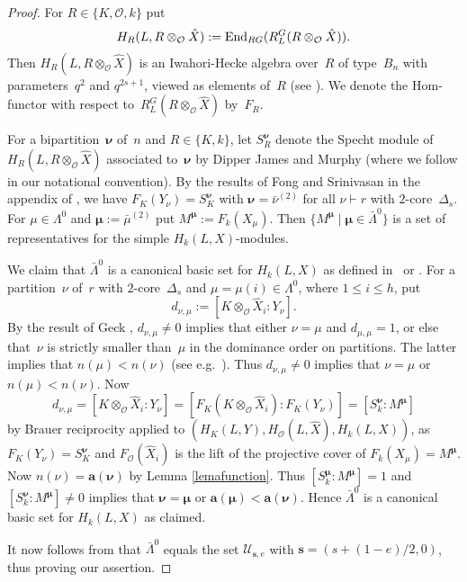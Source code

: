 \documentclass[twoside,12pt]{amsart}
\theoremstyle{plain}
\begin{document}
\begin{proof}
For $R \in \{ K, \mathcal{O}, k \}$ put
$$H_R(L, R \otimes_{\mathcal{O}} \hat{X} ) :=
{\mbox{\rm End}}_{RG}( R_L^G( R \otimes_{\mathcal{O}} \hat{X} ) ).$$
Then $H_R(L, R \otimes_{\mathcal{O}} \hat{X} )$ is an Iwahori-Hecke
algebra over~$R$ of type~$B_n$ with parameters~$q^2$ and $q^{2s+1}$, viewed as
elements of~$R$ (see \cite[p.~$464$]{C}). We denote the Hom-functor with respect 
to~$R_L^G( R \otimes_{\mathcal{O}} \hat{X} )$ by~$F_R$.

For a bipartition~${\boldsymbol{\nu}}$ of~$n$ and $R \in \{K, k \}$, let $S^{\boldsymbol{\nu}}_R$
denote the Specht module of $H_R( L, R \otimes_{\mathcal{O}} \hat{X} )$
associated to~${\boldsymbol{\nu}}$ by Dipper James and Murphy \cite[Theorem~$4.22$]{DiJaMu} 
(where we follow \cite{GeckJacon2011} in our notational convention).
By the results of Fong and Srinivasan in the appendix of 
\cite{FongSrinivasan1990}, we have $F_K( Y_\nu ) = S_K^{\boldsymbol{\nu}}$
with ${\boldsymbol{\nu}} = \bar{\nu}^{(2)}$ for all $\nu \vdash r$ with $2$-core~$\Delta_s$.
For $\mu \in \Lambda^0$ and ${\boldsymbol{\mu}} := \bar{\mu}^{(2)}$ put $M^{\boldsymbol{\mu}} := 
F_k( X_\mu )$. Then $\{ M^{\boldsymbol{\mu}} \mid {\boldsymbol{\mu}} \in \bar{\Lambda}^0 \}$ is a set
of representatives for the simple $H_k( L, X )$-modules.

We claim that $\bar{\Lambda}^0$ is a canonical basic set for $H_k( L, X )$
as defined in~\cite[Definition~$3.2.1$]{GeckJacon2011} or 
\cite[Definition~$2.4$]{GeckJacon2006}. 
For a partition~$\nu$ of~$r$ with
$2$-core~$\Delta_s$ and
$\mu  = \mu(i) \in \Lambda^0$,  where $1 \leq i \leq h$, put 
$$d_{\nu,\mu} := [ K \otimes_{\mathcal{O}} \hat{X}_i\colon\!Y_\nu ].$$
By the result of Geck \cite{Geck1991}, $d_{\nu,\mu} \neq 0$ implies that 
either $\nu = \mu$ and $d_{\mu,\mu} = 1$, or else that~$\nu$ is strictly 
smaller than~$\mu$
in the dominance order on partitions. The latter implies that
$n( \mu ) < n( \nu )$ (see e.g.\ \cite[Exercise~$5.6$]{GeckPfeiffer2000}). 
Thus $d_{\nu,\mu} \neq 0$ implies that $\nu = \mu$ or $n(\mu) < n(\nu)$.
Now
$$d_{\nu,\mu} = [ K \otimes_{\mathcal{O}} \hat{X}_i\colon\!Y_\nu ]
= [ F_K( K \otimes_{\mathcal{O}} \hat{X}_i )\colon\!F_K( Y_\nu ) ]
= [ S_k^{\boldsymbol{\nu}}\colon\!M^{\boldsymbol{\mu}} ]$$
by Brauer reciprocity applied to $(H_K( L, Y ), H_{\mathcal{O}}( L, \hat{X} ),
H_k( L, X ) )$, as $F_K( Y_\nu ) = S_K^{\boldsymbol{\nu}}$ and 
$F_{\mathcal{O}}( \hat{X}_i )$ is the lift of the projective cover of
$F_k( X_{\mu} ) = M^{\boldsymbol{\mu}}$. 
Now $n( \nu ) = \mathbf{a}({\boldsymbol{\nu}})$ by Lemma \ref{lemafunction}.
Thus $[ S_k^{\boldsymbol{\mu}}\colon\!M^{\boldsymbol{\mu}} ] = 1$
and $[ S_k^{\boldsymbol{\nu}}\colon\!M^{\boldsymbol{\mu}} ] \neq 0$ implies that ${\boldsymbol{\nu}} = {\boldsymbol{\mu}}$
or $\mathbf{a}({\boldsymbol{\mu}}) < \mathbf{a}({\boldsymbol{\nu}})$. Hence $\bar{\Lambda}^0$ is a
canonical basic set for $H_k(L,X)$ as claimed.

It now follows from
\cite[Lemma~$5.2$ and Example~$5.6$]{GeckJacon2006} that $\bar{\Lambda}^0$ 
equals the set ${\mathcal{U}}_{{\mathbf{s}},e}$ with ${\mathbf{s}} = (s + (1-e)/2,0)$, thus proving our 
assertion.
\end{proof}
\end{document}
